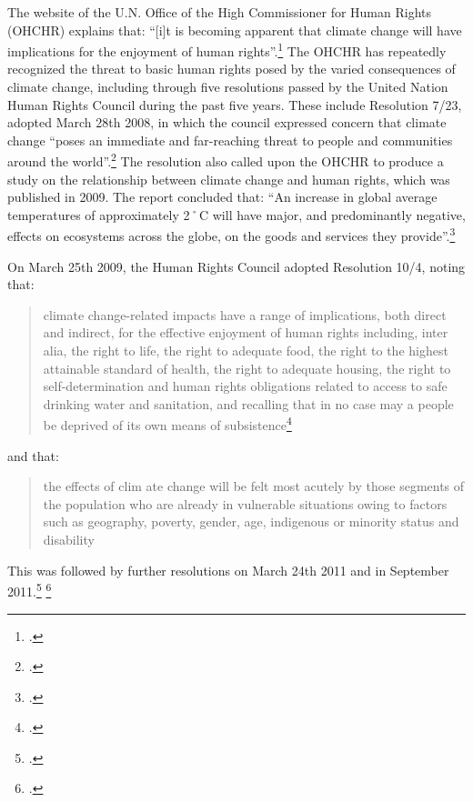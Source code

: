 The website of the U.N. Office of the High Commissioner for Human Rights (OHCHR) explains that: ``[i]t is becoming apparent that climate change will have implications for the enjoyment of human rights''.\footcite[][]{UNHumanRightsWebsite}
The OHCHR has repeatedly recognized the threat to basic human rights posed by the varied consequences of climate change, including through five resolutions passed by the United Nation Human Rights Council during the past five years.
These include Resolution 7/23, adopted March 28th 2008, in which the council expressed concern that climate change ``poses an immediate and far-reaching threat to people and communities around the world''.\footcite[][]{UNHRC2008}
The resolution also called upon the OHCHR to produce a study on the relationship between climate change and human rights, which was published in 2009.
The report concluded that: ``An increase in global average temperatures of approximately 2˚C will have major, and predominantly negative, effects on ecosystems across the globe, on the goods and services they provide''.\footcite[][p. 7]{OHCHRStudy2009}


On March 25th 2009, the Human Rights Council adopted Resolution 10/4, noting that:
\begin{quote}
climate change-related impacts have a range of implications, both direct and indirect, for the effective enjoyment of human rights including, inter alia, the right to life, the right to adequate food, the right to the highest attainable standard of health, the right to adequate housing, the right to self-determination and human rights obligations related to access to safe drinking water and sanitation, and recalling that in no case may a people be deprived of its own means of subsistence\footcite[][]{UNHRC2009}
\end{quote}
and that:
\begin{quote}
the effects of clim ate change will be felt most acutely by those segments of the population who are already in vulnerable situations owing to factors such as geography, poverty, gender, age, indigenous or minority status and disability
\end{quote}
This was followed by further resolutions on March 24th 2011 and in September 2011.\footcite[][]{UNHRC1611} \footcite[][]{UNHRC1822}



